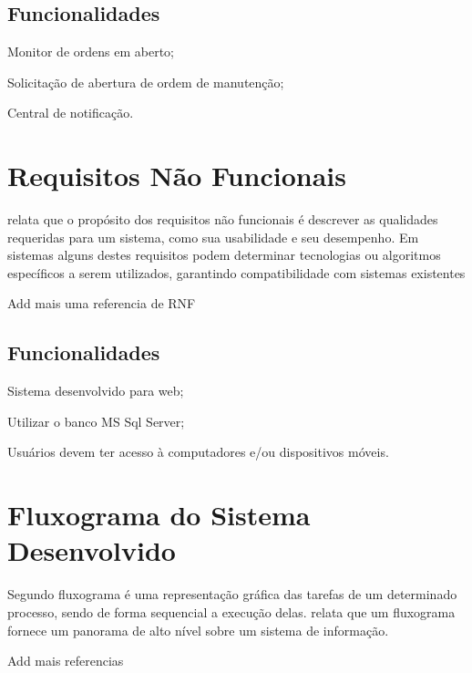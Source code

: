 \subsection{Funcionalidades}
\begin{subalineas}
	\item {Monitor de ordens em aberto};
	\item {Solicitação de abertura de ordem de manutenção};
	\item {Central de notificação}.
\end{subalineas}

\section{Requisitos Não Funcionais}

{\cite{IIBA2005} relata que o propósito dos requisitos não funcionais é descrever as qualidades requeridas para um sistema, como sua usabilidade e seu desempenho. Em sistemas alguns destes requisitos podem determinar tecnologias ou algoritmos específicos a serem utilizados, garantindo compatibilidade com sistemas existentes \cite{cordeiro2007}
	
{\color{red} Add mais uma referencia de RNF}

\subsection{Funcionalidades}
\begin{subalineas}
	\item {Sistema desenvolvido para web};
	\item {Utilizar o banco MS Sql Server};
	\item {Usuários devem ter acesso à computadores e/ou dispositivos móveis}.
\end{subalineas}




\section{Fluxograma do Sistema Desenvolvido}

{Segundo \cite{pejeronimo2002} fluxograma é uma representação gráfica das tarefas de um determinado processo, sendo de forma sequencial a execução delas. \cite{roberthurt} relata que um fluxograma fornece um panorama de alto nível sobre um sistema de informação.

{\color{red} Add mais referencias}

}}
